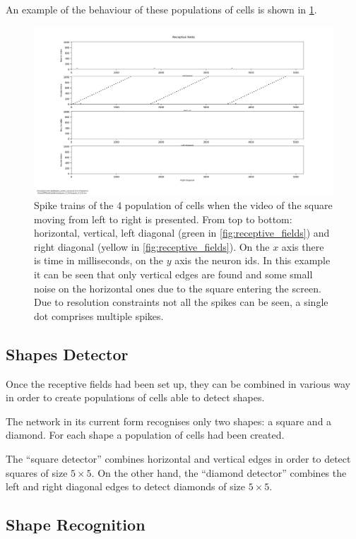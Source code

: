 An example of the behaviour of these populations of cells is shown in \cref{fig:receptive_fields_square_lr}.

\begin{figure}[ht]
\centering
\includegraphics[width=\textwidth]{images/development/receptive_fields_square_lr.png}
\caption[Receptive Fields Spike Trains of Square]{Spike trains of the 4 population of cells when the video of the square moving from left to right is presented. From top to bottom: horizontal, vertical, left diagonal (green in \cref{fig:receptive_fields}) and right diagonal (yellow in \cref{fig:receptive_fields}). On the $x$ axis there is time in milliseconds, on the $y$ axis the neuron ids. In this example it can be seen that only vertical edges are found and some small noise on the horizontal ones due to the square entering the screen. Due to resolution constraints not all the spikes can be seen, a single dot comprises multiple spikes.}
\label{fig:receptive_fields_square_lr}
\end{figure}

\subsection{Shapes Detector}
Once the receptive fields had been set up, they can be combined in various way in order to create populations of cells able to detect shapes.

The network in its current form recognises only two shapes: a square and a diamond. For each shape a population of cells had been created.

The ``square detector'' combines horizontal and vertical edges in order to detect squares of size $5 \times 5$. On the other hand, the ``diamond detector'' combines the left and right diagonal edges to detect diamonds of size $5 \times 5$. 

\subsection{Shape Recognition}



